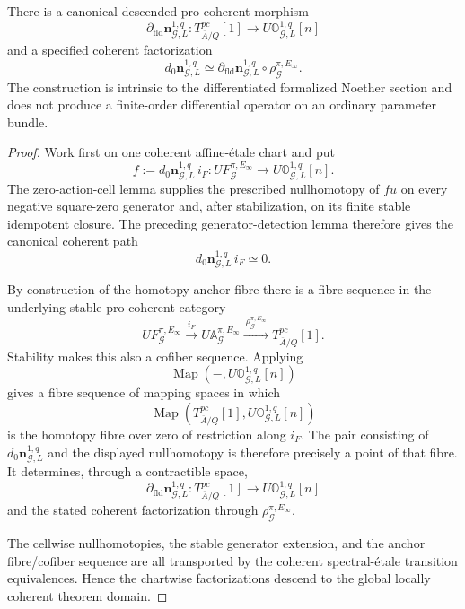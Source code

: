 \begin{theorem}
\label{thm:symmetry-noether-field-action-factorization-of-the-first-noether-derivative}
There is a canonical descended pro-coherent morphism
\[
\boxed{
\partial_{\mathrm{fld}}\mathbf n_{\mathcal G,L}^{1,q}:
T^{pc}_{\overline A/Q}[1]
\longrightarrow
U\mathbb O_{\mathcal G,L}^{1,q}[n]
}
\]
and a specified coherent factorization
\[
\boxed{
d_0\mathbf n_{\mathcal G,L}^{1,q}
\simeq
\partial_{\mathrm{fld}}\mathbf n_{\mathcal G,L}^{1,q}
\circ
\rho_{\mathcal G}^{\pi,E_\infty}.
}
\]
The construction is intrinsic to the differentiated formalized Noether section and
does not produce a finite-order differential operator on an ordinary parameter
bundle.
\end{theorem}

\begin{proof}
Work first on one coherent affine-\'etale chart and put
\[
f:=
d_0\mathbf n_{\mathcal G,L}^{1,q}\,i_F:
UF_{\mathcal G}^{\pi,E_\infty}
\longrightarrow
U\mathbb O_{\mathcal G,L}^{1,q}[n].
\]
The zero-action-cell lemma supplies the prescribed nullhomotopy of $fu$ on every
negative square-zero generator and, after stabilization, on its finite stable
idempotent closure.  The preceding generator-detection lemma therefore gives the
canonical coherent path
\[
\boxed{
d_0\mathbf n_{\mathcal G,L}^{1,q}\,i_F\simeq0.
}
\]

By construction of the homotopy anchor fibre there is a fibre sequence in the
underlying stable pro-coherent category
\[
UF_{\mathcal G}^{\pi,E_\infty}
\xrightarrow{\ i_F\ }
U\mathbb A_{\mathcal G}^{\pi,E_\infty}
\xrightarrow{\ \rho_{\mathcal G}^{\pi,E_\infty}\ }
T^{pc}_{\overline A/Q}[1].
\]
Stability makes this also a cofiber sequence.  Applying
\[
\operatorname{Map}
\left(-,U\mathbb O_{\mathcal G,L}^{1,q}[n]\right)
\]
gives a fibre sequence of mapping spaces in which
\[
\operatorname{Map}
\left(T^{pc}_{\overline A/Q}[1],U\mathbb O_{\mathcal G,L}^{1,q}[n]\right)
\]
is the homotopy fibre over zero of restriction along $i_F$.  The pair consisting
of $d_0\mathbf n_{\mathcal G,L}^{1,q}$ and the displayed nullhomotopy is therefore
precisely a point of that fibre.  It determines, through a contractible space,
\[
\partial_{\mathrm{fld}}\mathbf n_{\mathcal G,L}^{1,q}:
T^{pc}_{\overline A/Q}[1]
\longrightarrow
U\mathbb O_{\mathcal G,L}^{1,q}[n]
\]
and the stated coherent factorization through
$\rho_{\mathcal G}^{\pi,E_\infty}$.

The cellwise nullhomotopies, the stable generator extension, and the anchor
fibre/cofiber sequence are all transported by the coherent spectral-\'etale
transition equivalences.  Hence the chartwise factorizations descend to the global
locally coherent theorem domain.
\end{proof}

